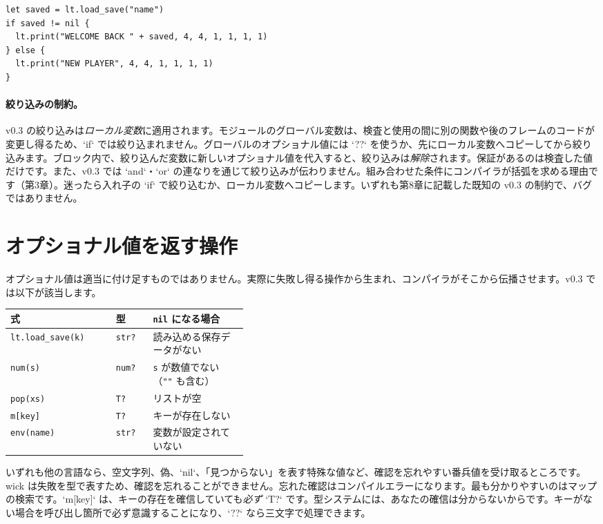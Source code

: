 \begin{lstlisting}[language=wick]
let saved = lt.load_save("name")
if saved != nil {
  lt.print("WELCOME BACK " + saved, 4, 4, 1, 1, 1, 1)
} else {
  lt.print("NEW PLAYER", 4, 4, 1, 1, 1, 1)
}
\end{lstlisting}

\paragraph{絞り込みの制約。} v0.3 の絞り込みは\emph{ローカル変数}に適用されます。モジュールのグローバル変数は、検査と使用の間に別の関数や後のフレームのコードが変更し得るため、`if` では絞り込まれません。グローバルのオプショナル値には `??` を使うか、先にローカル変数へコピーしてから絞り込みます。ブロック内で、絞り込んだ変数に新しいオプショナル値を代入すると、絞り込みは\emph{解除}されます。保証があるのは検査した値だけです。また、v0.3 では `and`・`or` の連なりを通じて絞り込みが伝わりません。組み合わせた条件にコンパイラが括弧を求める理由です（第3章）。迷ったら入れ子の `if` で絞り込むか、ローカル変数へコピーします。いずれも第8章に記載した既知の v0.3 の制約で、バグではありません。

\section{オプショナル値を返す操作}

オプショナル値は適当に付け足すものではありません。実際に失敗し得る操作から生まれ、コンパイラがそこから伝播させます。v0.3 では以下が該当します。

\begin{center}
\begin{tabular}{@{}llp{0.40\linewidth}@{}}
\toprule
\textbf{式} & \textbf{型} & \textbf{\texttt{nil} になる場合} \\
\midrule
\texttt{lt.load\_save(k)} & \texttt{str?} & 読み込める保存データがない \\
\texttt{num(s)} & \texttt{num?} & \texttt{s} が数値でない（\texttt{""} も含む） \\
\texttt{pop(xs)} & \texttt{T?} & リストが空 \\
\texttt{m[key]} & \texttt{T?} & キーが存在しない \\
\texttt{env(name)} & \texttt{str?} & 変数が設定されていない \\
\bottomrule
\end{tabular}
\end{center}

\noindent
いずれも他の言語なら、空文字列、偽、`nil`、「見つからない」を表す特殊な値など、確認を忘れやすい番兵値を受け取るところです。wick は失敗を型で表すため、確認を忘れることができません。忘れた確認はコンパイルエラーになります。最も分かりやすいのはマップの検索です。`m[key]` は、キーの存在を確信していても\emph{必ず} `T?` です。型システムには、あなたの確信は分からないからです。キーがない場合を呼び出し箇所で必ず意識することになり、`??` なら三文字で処理できます。

